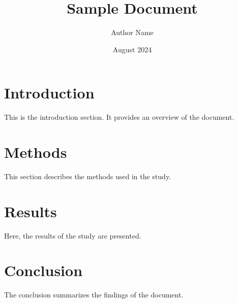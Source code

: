 \documentclass{article}
\title{Sample Document}
\author{Author Name}
\date{August 2024}
\begin{document}
\section{Introduction}
This is the introduction section. It provides an overview of the document.

\section{Methods}
This section describes the methods used in the study.

\section{Results}
Here, the results of the study are presented.

\section{Conclusion}
The conclusion summarizes the findings of the document.
\end{document}
